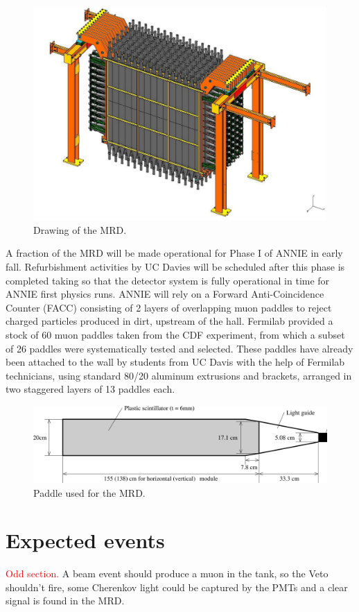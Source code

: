 \begin{figure}
  \centering
  \includegraphics[scale=.15]{pics/pag23Nakajimathesis}
  \caption{Drawing of the MRD.}
  \label{fig:mrd}
\end{figure}


A fraction of the MRD will be made operational for Phase I of ANNIE in early fall.
Refurbishment activities by UC Davies will be scheduled after this phase is completed taking %
so that the detector system is fully operational in time for ANNIE first physics runs.
ANNIE will rely on a Forward Anti-Coincidence Counter (FACC) consisting of 2 layers %
of overlapping muon paddles to reject charged particles produced in dirt, upstream of the hall.
Fermilab provided a stock of 60 muon paddles taken from the CDF experiment, from which a subset %
of 26 paddles were systematically tested and selected.
These paddles have already been attached to the wall by students from UC Davis with %
the help of Fermilab technicians, using standard 80/20 aluminum extrusions and brackets, %
arranged in two staggered layers of 13 paddles each.

\begin{figure}[]
  \centering
  \includegraphics[scale=0.20]{pics/pag24Nakajimathesis}
  \caption{Paddle used for the MRD.}
  \label{fig:paddle}
\end{figure}

\section{Expected events}
\label{2.4}
\textcolor{red}{Odd section.}
A beam event should produce a muon in the tank, so the Veto shouldn't fire, %
some Cherenkov light could be captured by the PMTs and a clear signal is found in the MRD.
